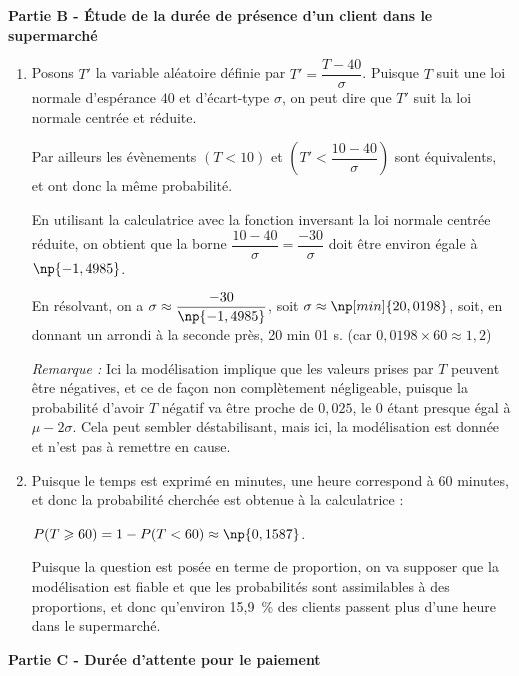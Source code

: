 \documentclass[10pt]{article}
\begin{document}
	\bigskip
	
	\textbf{Partie B - Étude de la durée de présence d'un client dans le supermarché}
	
	\medskip

	\begin{enumerate}
		\item Posons $T'$ la variable aléatoire définie par $T' = \dfrac{T - 40}{\sigma}$. Puisque $T$ suit une loi normale d'espérance $40$ et d'écart-type $\sigma$, on peut dire que $T'$ suit la loi normale centrée et réduite.
		
		Par ailleurs les évènements $(T < 10)$ et $\left (T' < \dfrac{10 - 40}{\sigma}\right)$ sont équivalents, et ont donc la même probabilité.
		
		En utilisant la calculatrice avec la fonction inversant la loi normale centrée réduite, on obtient que la borne $\dfrac{10 - 40 }{\sigma} = \dfrac{-30}{\sigma}$ doit être environ égale à $\np{-1,4985}$.
		
		En résolvant, on a $\sigma \approx \dfrac{-30}{\np{-1,4985}}$, soit $\sigma \approx \np[min]{20,0198}$, soit, en donnant un arrondi à la seconde près, 20 min 01 s. (car $0,0198 \times 60 \approx 1,2$)
		
		\medskip
		
		\textit{Remarque :} Ici la modélisation implique que les valeurs prises par $T$ peuvent être négatives, et ce de façon non complètement négligeable, puisque la probabilité d'avoir $T$ négatif va être proche de $0,025$, le 0 étant presque égal à $\mu - 2\sigma$.
		Cela peut sembler déstabilisant, mais ici, la modélisation est donnée et n'est pas à remettre en cause.
		
		\item Puisque le temps est exprimé en minutes, une heure correspond à 60 minutes, et donc la probabilité cherchée est obtenue à la calculatrice :
		
		$P( T \geqslant 60) = 1 - P(T < 60) \approx \np{0,1587}$.
		
		Puisque la question est posée en terme de proportion, on va supposer que la modélisation est fiable et que les probabilités sont assimilables à des proportions, et donc qu'environ 15,9~\% des clients passent plus d'une heure dans le supermarché.
	\end{enumerate}

	
	\bigskip
	
	\textbf{Partie C - Durée d'attente pour le paiement}
	
	\medskip
\end{document}
